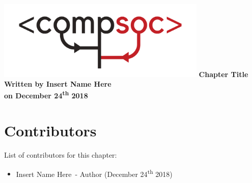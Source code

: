 \documentclass[a4paper, 12pt]{article}
\newcommand{\authorName}{Insert Name Here}
\newcommand{\dateWritten}{December 24\textsuperscript{th} 2018}
\begin{document}
\begin{titlepage}
    \centering
    \vfill
    \includegraphics[width=10cm]{./resources/images/comp_soc_logo_short.png}
    \vfill
    {\bfseries\Large
        Chapter Title\\
        \vskip2cm
        Written by \authorName\\
        on \dateWritten\\
    }    
    \vfill
    \vfill
    \vfill
\end{titlepage}
\pagestyle{empty}
\section*{Contributors}
List of contributors for this chapter:
\begin{itemize}
    \item \authorName \, - Author (\dateWritten)
\end{itemize}
\newpage
\tableofcontents
\newpage


\setcounter{page}{1}
\pagestyle{plain}
\end{document}
